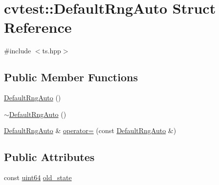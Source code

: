 \hypertarget{structcvtest_1_1DefaultRngAuto}{\section{cvtest\-:\-:Default\-Rng\-Auto Struct Reference}
\label{structcvtest_1_1DefaultRngAuto}
}


{\ttfamily \#include $<$ts.\-hpp$>$}

\subsection*{Public Member Functions}
\begin{DoxyCompactItemize}
\item 
\hyperlink{structcvtest_1_1DefaultRngAuto_ab228f10099708488985fea821787f63a}{Default\-Rng\-Auto} ()
\item 
\hyperlink{structcvtest_1_1DefaultRngAuto_acdf457c9af6d4f130873e2aa76f2d869}{$\sim$\-Default\-Rng\-Auto} ()
\item 
\hyperlink{structcvtest_1_1DefaultRngAuto}{Default\-Rng\-Auto} \& \hyperlink{structcvtest_1_1DefaultRngAuto_a41b177f581303051f66e70350a2ace9b}{operator=} (const \hyperlink{structcvtest_1_1DefaultRngAuto}{Default\-Rng\-Auto} \&)
\end{DoxyCompactItemize}
\subsection*{Public Attributes}
\begin{DoxyCompactItemize}
\item 
const \hyperlink{core_2types__c_8h_abc0f5bc07737e498f287334775dff2b6}{uint64} \hyperlink{structcvtest_1_1DefaultRngAuto_ab85a270aaa3061655e401d43f126be1c}{old\-\_\-state}
\end{DoxyCompactItemize}


